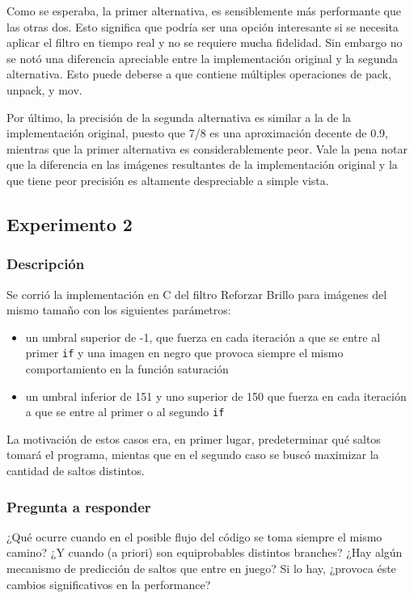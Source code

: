 \par Como se esperaba, la primer alternativa, es sensiblemente más performante que las otras dos. Esto significa que podría ser una opción interesante si se
necesita aplicar el filtro en tiempo real y no se requiere mucha fidelidad. Sin embargo no se notó una diferencia apreciable entre la
implementación original y la segunda alternativa. Esto puede deberse a que contiene múltiples operaciones de pack, unpack, y mov.
\par Por último, la precisión de la segunda alternativa es similar a la de la implementación original, puesto que 7/8 es una aproximación decente de 0.9,
mientras que la primer alternativa es considerablemente peor. Vale la pena notar que la diferencia en las imágenes resultantes de la implementación original y la que tiene peor precisión es altamente
despreciable a simple vista.

\subsection{Experimento 2}
\subsubsection{Descripción}

\par Se corrió la implementación en C del filtro Reforzar Brillo para imágenes del mismo tamaño con los siguientes parámetros: 
\begin{itemize}
	\item un umbral superior de -1, que fuerza en cada iteración a que se entre al primer \texttt{if} y una imagen en negro que provoca siempre el mismo comportamiento en la función saturación
	\item un umbral inferior de 151 y uno superior de 150 que fuerza en cada iteración a que se entre al primer o al segundo \texttt{if}
\end{itemize}
\par La motivación de estos casos era, en primer lugar, predeterminar qué saltos tomará el programa, mientas que en el segundo caso se buscó
maximizar la cantidad de saltos distintos.

\subsubsection{Pregunta a responder}
\par ¿Qué ocurre cuando en el posible flujo del código se toma siempre el mismo camino? ¿Y cuando (a priori) son equiprobables distintos branches? ¿Hay algún mecanismo de predicción de 
saltos que entre en juego? Si lo hay, ¿provoca éste cambios significativos en la performance?

